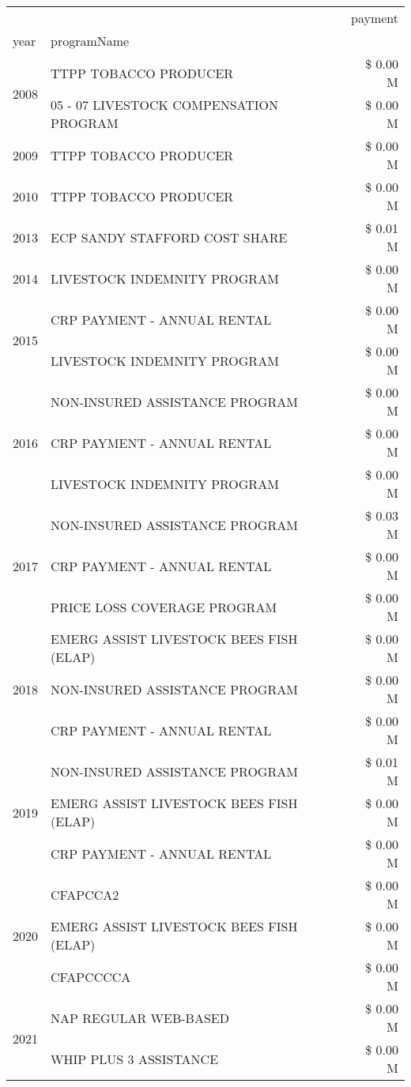 \begin{tabular}{llr}
\toprule
 &  & payment \\
year & programName &  \\
\midrule
\multirow[t]{2}{*}{2008} & TTPP TOBACCO PRODUCER & \$ 0.00 M \\
 & 05 - 07 LIVESTOCK COMPENSATION PROGRAM & \$ 0.00 M \\
\cline{1-3}
2009 & TTPP TOBACCO PRODUCER & \$ 0.00 M \\
\cline{1-3}
2010 & TTPP TOBACCO PRODUCER & \$ 0.00 M \\
\cline{1-3}
2013 & ECP SANDY STAFFORD COST SHARE & \$ 0.01 M \\
\cline{1-3}
2014 & LIVESTOCK INDEMNITY PROGRAM & \$ 0.00 M \\
\cline{1-3}
\multirow[t]{2}{*}{2015} & CRP PAYMENT - ANNUAL RENTAL & \$ 0.00 M \\
 & LIVESTOCK INDEMNITY PROGRAM & \$ 0.00 M \\
\cline{1-3}
\multirow[t]{3}{*}{2016} & NON-INSURED ASSISTANCE PROGRAM & \$ 0.00 M \\
 & CRP PAYMENT - ANNUAL RENTAL & \$ 0.00 M \\
 & LIVESTOCK INDEMNITY PROGRAM & \$ 0.00 M \\
\cline{1-3}
\multirow[t]{3}{*}{2017} & NON-INSURED ASSISTANCE PROGRAM & \$ 0.03 M \\
 & CRP PAYMENT - ANNUAL RENTAL & \$ 0.00 M \\
 & PRICE LOSS COVERAGE PROGRAM & \$ 0.00 M \\
\cline{1-3}
\multirow[t]{3}{*}{2018} & EMERG ASSIST LIVESTOCK BEES FISH (ELAP) & \$ 0.00 M \\
 & NON-INSURED ASSISTANCE PROGRAM & \$ 0.00 M \\
 & CRP PAYMENT - ANNUAL RENTAL & \$ 0.00 M \\
\cline{1-3}
\multirow[t]{3}{*}{2019} & NON-INSURED ASSISTANCE PROGRAM & \$ 0.01 M \\
 & EMERG ASSIST LIVESTOCK BEES FISH (ELAP) & \$ 0.00 M \\
 & CRP PAYMENT - ANNUAL RENTAL & \$ 0.00 M \\
\cline{1-3}
\multirow[t]{3}{*}{2020} & CFAPCCA2 & \$ 0.00 M \\
 & EMERG ASSIST LIVESTOCK BEES FISH (ELAP) & \$ 0.00 M \\
 & CFAPCCCCA & \$ 0.00 M \\
\cline{1-3}
\multirow[t]{2}{*}{2021} & NAP REGULAR WEB-BASED & \$ 0.00 M \\
 & WHIP PLUS 3 ASSISTANCE & \$ 0.00 M \\
\cline{1-3}
\bottomrule
\end{tabular}
